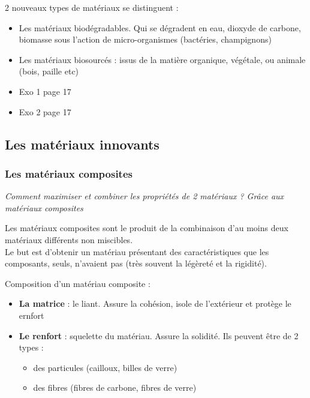 \documentclass[a4paper,12pt]{article}
\begin{document}
2 nouveaux types de matériaux se distinguent : 
\begin{itemize}[noitemsep]
  \item Les matériaux biodégradables. Qui se dégradent en eau, dioxyde de carbone, biomasse sous l’action de micro-organismes (bactéries, champignons) 
  \item Les matériaux biosourcés : issus de la matière organique, végétale, ou animale (bois, paille etc)
\end{itemize}


\begin{tcolorbox}[colback=blue!10!white, colframe=blue!75!black, title=Exemples - Application]
  \begin{itemize}[noitemsep]
    \item Exo 1 page 17
    \item Exo 2 page 17
  \end{itemize}
\end{tcolorbox}

\subsection{Les matériaux innovants}

\subsubsection{Les matériaux composites}

\textit{Comment maximiser et combiner les propriétés de 2 matériaux ? Grâce aux matériaux composites}

\begin{tcolorbox}[colback=green!10!white, colframe=green!75!black, title=Définition : Matériaux composites]
  Les matériaux composites sont le produit de la combinaison d’au moins deux matériaux différents non miscibles. \\
  Le but est d’obtenir un matériau présentant des caractéristiques que les composants, seuls, n’avaient pas (très souvent la légèreté et la rigidité).
\end{tcolorbox}

\vspace{1em}

Composition d'un matériau composite : 
\begin{itemize}[noitemsep]
  \item \textbf{La matrice} : le liant. Assure la cohésion, isole de l'extérieur et protège le ernfort
  \item \textbf{Le renfort} : squelette du matériau. Assure la solidité. Ils peuvent être de 2 types : 
  \begin{itemize}[noitemsep]
    \item des particules (cailloux, billes de verre)
    \item des fibres (fibres de carbone, fibres de verre)
  \end{itemize}
\end{itemize}
\end{document}
